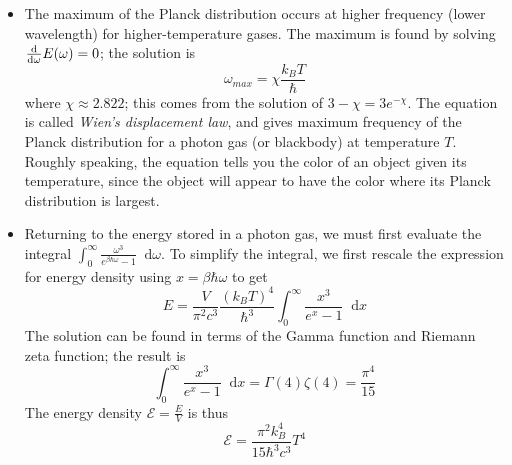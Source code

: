 \documentclass[11pt, a4paper]{article}
\newcommand{\diff}{\mathop{}\!\mathrm{d}} %
\begin{document}
\begin{itemize}
	\item The maximum of the Planck distribution occurs at higher frequency (lower wavelength) for higher-temperature gases. The maximum is found by solving $ \dv{}{\omega}E(\omega) = 0$; the solution is 
	\begin{equation*}
		\omega_{max} = \chi \frac{k_{B}T}{\hbar}
	\end{equation*}
	where $ \chi \approx 2.822 $; this comes from the solution of $ 3 - \chi = 3e^{-\chi} $. The equation is called \textit{Wien's displacement law}, and gives maximum frequency of the Planck distribution for a photon gas (or blackbody) at temperature $ T $. Roughly speaking, the equation tells you the color of an object given its temperature, since the object will appear to have the color where its Planck distribution is largest.
	
	\item Returning to the energy stored in a photon gas, we must first evaluate the integral $ \int_{0}^{\infty} \frac{\omega^{3}}{e^{\beta \hbar \omega} - 1}\diff \omega $. To simplify the integral, we first rescale the expression for energy density using $ x = \beta \hbar \omega $ to get
	\begin{equation*}
		E = \frac{V}{\pi^{2}c^{3}} \frac{(k_{B}T)^{4}}{\hbar^{3}} \int_{0}^{\infty}\frac{x^{3}}{e^{x}-1}\diff x
	\end{equation*}
	The solution can be found in terms of the Gamma function and Riemann zeta function; the result is
	\begin{equation*}
		\int_{0}^{\infty}\frac{x^{3}}{e^{x}-1}\diff x = \Gamma(4) \zeta(4) = \frac{\pi^{4}}{15}
	\end{equation*}
	The energy density $ \mathcal{E} = \frac{E}{V} $ is thus
	\begin{equation*}
		\mathcal{E} = \frac{\pi^{2}k_{B}^{4}}{15 \hbar^{3}c^{3}}T^{4}
	\end{equation*}
	

\end{itemize}
\end{document}

